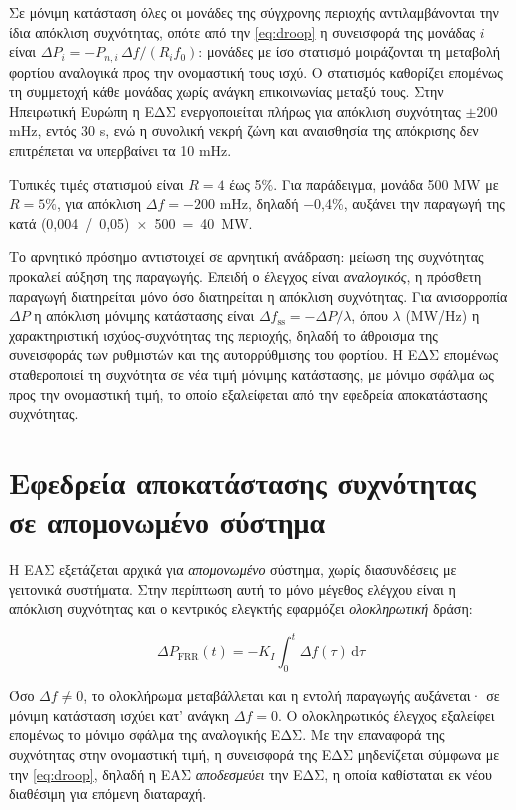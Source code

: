 Σε μόνιμη κατάσταση όλες οι μονάδες της σύγχρονης περιοχής αντιλαμβάνονται την ίδια
απόκλιση συχνότητας, οπότε από την \eqref{eq:droop} η συνεισφορά της μονάδας $i$ είναι
$\Delta P_i = -P_{n,i}\,\Delta f / (R_i f_0)$: μονάδες με ίσο στατισμό μοιράζονται τη
μεταβολή φορτίου αναλογικά προς την ονομαστική τους ισχύ. Ο στατισμός καθορίζει επομένως τη
συμμετοχή κάθε μονάδας χωρίς ανάγκη επικοινωνίας μεταξύ τους. Στην Ηπειρωτική Ευρώπη η ΕΔΣ
ενεργοποιείται πλήρως για απόκλιση συχνότητας $\pm 200$ mHz, εντός 30 s, ενώ η συνολική νεκρή
ζώνη και αναισθησία της απόκρισης δεν επιτρέπεται να υπερβαίνει τα 10 mHz.

Τυπικές τιμές στατισμού είναι $R = 4$ έως 5\%. Για παράδειγμα, μονάδα 500 MW με $R = 5\%$,
για απόκλιση $\Delta f = -200$ mHz, δηλαδή −0,4\%, αυξάνει την παραγωγή της κατά
(0,004~/~0,05)~×~500~=~40~MW.

Το αρνητικό πρόσημο αντιστοιχεί σε αρνητική ανάδραση: μείωση της συχνότητας προκαλεί αύξηση
της παραγωγής. Επειδή ο έλεγχος είναι \emph{αναλογικός}, η πρόσθετη παραγωγή διατηρείται μόνο
όσο διατηρείται η απόκλιση συχνότητας. Για ανισορροπία $\Delta P$ η απόκλιση μόνιμης
κατάστασης είναι $\Delta f_{\mathrm{ss}} = -\Delta P / \lambda$, όπου $\lambda$ (MW/Hz) η
χαρακτηριστική ισχύος-συχνότητας της περιοχής, δηλαδή το άθροισμα της συνεισφοράς των
ρυθμιστών και της αυτορρύθμισης του φορτίου. Η ΕΔΣ επομένως σταθεροποιεί τη συχνότητα σε
νέα τιμή μόνιμης κατάστασης, με μόνιμο σφάλμα ως προς την ονομαστική τιμή, το οποίο
εξαλείφεται από την εφεδρεία αποκατάστασης συχνότητας.

\section{Εφεδρεία αποκατάστασης συχνότητας σε απομονωμένο σύστημα}
\label{sec:frr-single}

Η ΕΑΣ εξετάζεται αρχικά για \emph{απομονωμένο} σύστημα, χωρίς διασυνδέσεις με γειτονικά
συστήματα. Στην περίπτωση αυτή το μόνο μέγεθος ελέγχου είναι η απόκλιση συχνότητας και ο
κεντρικός ελεγκτής εφαρμόζει \emph{ολοκληρωτική} δράση:

\begin{equation}
\Delta P_{\mathrm{FRR}}(t) = -K_I \int_0^{t} \Delta f(\tau)\,\mathrm{d}\tau
\label{eq:frr-isolated}
\end{equation}

Όσο $\Delta f \neq 0$, το ολοκλήρωμα μεταβάλλεται και η εντολή παραγωγής αυξάνεται· σε μόνιμη
κατάσταση ισχύει κατ' ανάγκη $\Delta f = 0$. Ο ολοκληρωτικός έλεγχος εξαλείφει επομένως το
μόνιμο σφάλμα της αναλογικής ΕΔΣ. Με την επαναφορά της συχνότητας στην ονομαστική τιμή, η
συνεισφορά της ΕΔΣ μηδενίζεται σύμφωνα με την \eqref{eq:droop}, δηλαδή η ΕΑΣ
\emph{αποδεσμεύει} την ΕΔΣ, η οποία καθίσταται εκ νέου διαθέσιμη για επόμενη διαταραχή.

